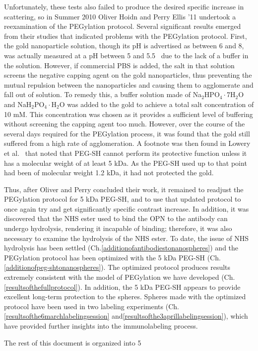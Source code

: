 Unfortunately, these tests also failed to produce the desired specific increase in scattering, so in Summer 2010 Oliver Hoidn and Perry Ellis '11 undertook a reexamination of the PEGylation protocol. Several significant results emerged from their studies that indicated problems with the PEGylation protocol. First, the gold nanoparticle solution, though its pH is advertised as between 6 and 8, was actually measured at a pH between 5 and 5.5~\citep{hoidnellis} due to the lack of a buffer in the solution. However, if commercial PBS is added, the salt in that solution screens the negative capping agent on the gold nanoparticles, thus preventing the mutual repulsion between the nanoparticles and causing them to agglomerate and fall out of solution. To remedy this, a buffer solution made of Na$_2$HPO$_4\cdot$7H$_2$O and NaH$_2$PO$_4\cdot$H$_2$O was added to the gold to achieve a total salt concentration of 10 mM. This concentration was chosen as it provides a sufficient level of buffering without screening the capping agent too much. However, over the course of the several days required for the PEGylation process, it was found that the gold still suffered from a high rate of agglomeration. A footnote was then found in Lowery et al.~\citep{westpegylation} that noted that PEG-SH cannot perform its protective function unless it has a molecular weight of at least 5 kDa. As the PEG-SH used up to that point had been of molecular weight 1.2 kDa, it had not protected the gold.

Thus, after Oliver and Perry concluded their work, it remained to readjust the PEGylation protocol for 5 kDa PEG-SH, and to use that updated protocol to once again try and get significantly specific contrast increase. In addition, it was discovered that the NHS ester used to bind the OPN to the antibody can undergo hydrolysis, rendering it incapable of binding; therefore, it was also necessary to examine the hydrolysis of the NHS ester. To date, the issue of NHS hydrolysis has been settled (Ch.\autoref{additionofantibodiestonanospheres}) and the PEGylation protocol has been optimized with the 5 kDa PEG-SH (Ch.\autoref{additionofpeg-shtonanospheres}). The optimized protocol produces results extremely consistent with the model of PEGylation we have developed (Ch.\autoref{resultsofthefullprotocol}). In addition, the 5 kDa PEG-SH appears to provide excellent long-term protection to the spheres. Spheres made with the optimized protocol have been used in two labeling experiments (Ch.\autoref{resultsofthe6marchlabelingsession} and\autoref{resultsofthe3aprillabelingsession}), which have provided further insights into the immunolabeling process.

The rest of this document is organized into 5 

